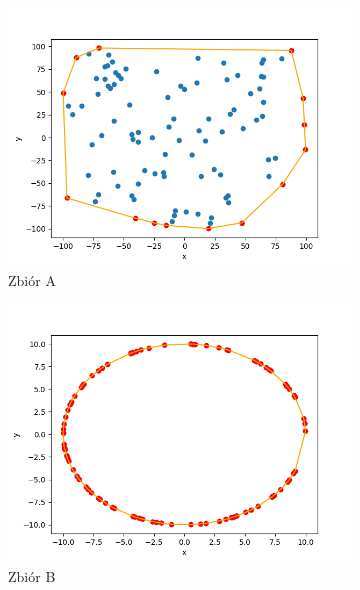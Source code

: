 \documentclass[11pt,a4paper]{article}
\begin{document}
\begin{figure}[H]
    \centering
    \begin{subfigure}[b]{0.46\textwidth}
        \centering
        \includegraphics[scale=0.5]{res/graham_a.png}
        \caption{
            Zbiór A 
        }
    \end{subfigure}
    \begin{subfigure}[b]{0.46\textwidth}
        \centering
        \includegraphics[scale=0.5]{res/graham_b.png}
        \caption{
            Zbiór B
        }
    \end{subfigure}
    \begin{subfigure}[b]{0.46\textwidth}
        \centering

\end{subfigure}
\end{figure}
\end{document}
